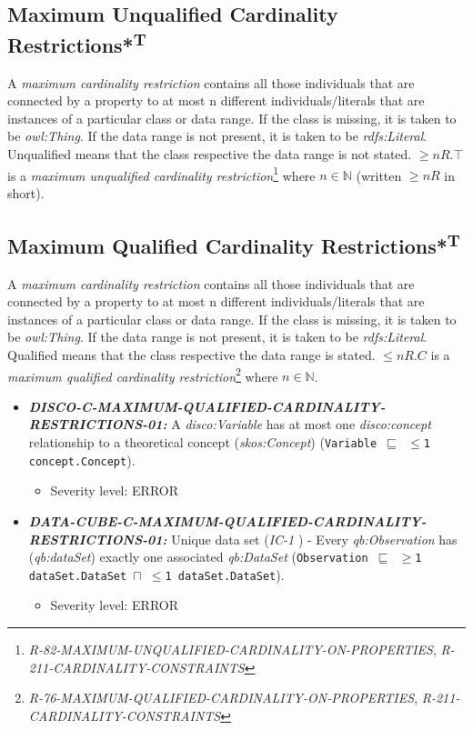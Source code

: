 \documentclass{llncs}
\newcommand{\ms}[1]{\texttt{#1}}
\begin{document}
\subsection{Maximum Unqualified Cardinality Restrictions*\textsuperscript{T}}

A \emph{maximum cardinality restriction} contains all those individuals that are connected by a property to at most n different individuals/literals that are instances of a particular class or data range. If the class is missing, it is taken to be \emph{owl:Thing}. If the data range is not present, it is taken to be \emph{rdfs:Literal}.
Unqualified means that the class respective the data range is not stated. 
$\geq n R. \top$ is a \emph{maximum unqualified cardinality restriction}\footnote{\emph{R-82-MAXIMUM-UNQUALIFIED-CARDINALITY-ON-PROPERTIES}, \emph{R-211-CARDINALITY-CONSTRAINTS}} where $n \in \mathbb{N}$ (written $\geq  n R$ in short).

\subsection{Maximum Qualified Cardinality Restrictions*\textsuperscript{T}}

A \emph{maximum cardinality restriction} contains all those individuals that are connected by a property to at most n different individuals/literals that are instances of a particular class or data range. If the class is missing, it is taken to be \emph{owl:Thing}. If the data range is not present, it is taken to be \emph{rdfs:Literal}.
Qualified means that the class respective the data range is stated. 
$\leq n R. C$ is a \emph{maximum qualified cardinality restriction}\footnote{\emph{R-76-MAXIMUM-QUALIFIED-CARDINALITY-ON-PROPERTIES}, \emph{R-211-CARDINALITY-CONSTRAINTS}} where $n \in \mathbb{N}$.

\begin{itemize}
	\item \textbf{{\em DISCO-C-MAXIMUM-QUALIFIED-CARDINALITY-RESTRICTIONS-01:}}
	A {\em disco:Variable} has at most one {\em disco:concept} relationship to a theoretical concept ({\em skos:Concept}) (\ms{Variable $\sqsubseteq$ $\leq$1 concept.Concept}).
	\begin{itemize}
		\item Severity level: ERROR
	\end{itemize}
	\item \textbf{{\em DATA-CUBE-C-MAXIMUM-QUALIFIED-CARDINALITY-RESTRICTIONS-01:}}
	Unique data set (\emph{IC-1} \cite{CyganiakReynolds2014}) -  
	Every \emph{qb:Observation} has (\emph{qb:dataSet}) exactly one associated \emph{qb:DataSet} (\ms{Observation $\sqsubseteq$ $\geq$1 dataSet.DataSet $\sqcap$ $\leq$1 dataSet.DataSet}). 
	\begin{itemize}
		\item Severity level: ERROR
	\end{itemize}
\end{itemize}
\end{document}
